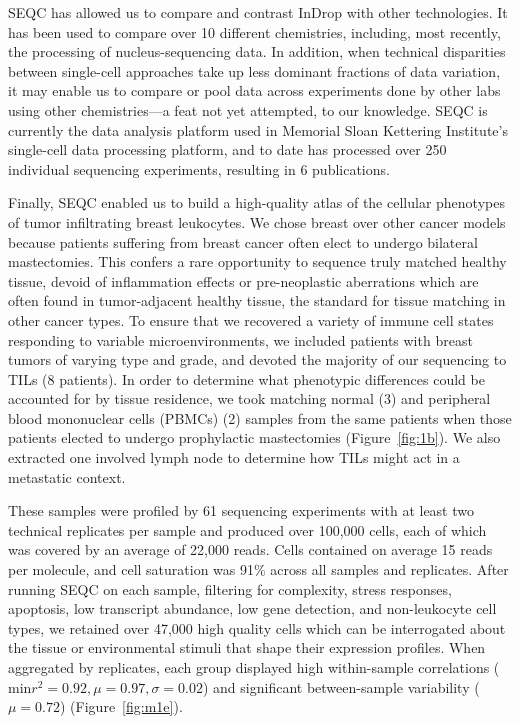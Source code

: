 SEQC has allowed us to compare and contrast InDrop with other technologies. 
It has been used to compare over 10 different chemistries, including, most recently, the processing of nucleus-sequencing data. 
In addition, when technical disparities between single-cell approaches take up less dominant fractions of data variation, it may enable us to compare or pool data across experiments done by other labs using other chemistries---a feat not yet attempted, to our knowledge.
SEQC is currently the data analysis platform used in Memorial Sloan Kettering Institute's single-cell data processing platform, and to date has processed over 250 individual sequencing experiments, resulting in 6 publications. 

Finally, SEQC enabled us to build a high-quality atlas of the cellular phenotypes of tumor infiltrating breast leukocytes. 
We chose breast over other cancer models because patients suffering from breast cancer often elect to undergo bilateral mastectomies. 
This confers a rare opportunity to sequence truly matched healthy tissue, devoid of inflammation effects or pre-neoplastic aberrations which are often found in tumor-adjacent healthy tissue, the standard for tissue matching in other cancer types. 
To ensure that we recovered a variety of immune cell states responding to variable microenvironments, we included patients with breast tumors of varying type and grade, and devoted the majority of our sequencing to TILs (8 patients). 
In order to determine what phenotypic differences could be accounted for by tissue residence, we took matching normal (3) and peripheral blood mononuclear cells (PBMCs) (2) samples from the same patients when those patients elected to undergo prophylactic mastectomies (Figure~\ref{fig:1b}). 
We also extracted one involved lymph node to determine how TILs might act in a metastatic context.  

These samples were profiled by 61 sequencing experiments with at least two technical replicates per sample and produced over 100,000 cells, each of which was covered by an average of 22,000 reads. 
Cells contained on average 15 reads per molecule, and cell saturation was 91\% across all samples and replicates. 
After running SEQC on each sample, filtering for complexity, stress responses, apoptosis, low transcript abundance, low gene detection, and non-leukocyte cell types, we retained over 47,000 high quality cells which can be interrogated about the tissue or environmental stimuli that shape their expression profiles.
When aggregated by replicates, each group displayed high within-sample correlations ($\text{min} r^{2} = 0.92, \mu = 0.97, \sigma = 0.02$) and significant between-sample variability ($\mu = 0.72$) (Figure~\ref{fig:m1e}).

